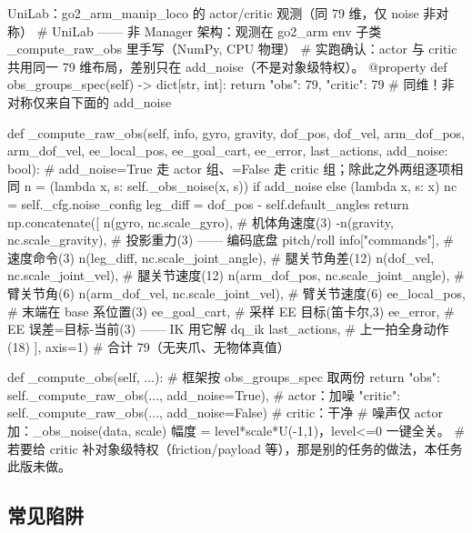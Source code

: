 \begin{codebox}[Python]{UniLab：go2\_arm\_manip\_loco 的 actor/critic 观测（同 79 维，仅 noise 非对称）}
# UniLab —— 非 Manager 架构：观测在 go2_arm env 子类 _compute_raw_obs 里手写（NumPy, CPU 物理）
# 实跑确认：actor 与 critic 共用同一 79 维布局，差别只在 add_noise（不是对象级特权）。
@property
def obs_groups_spec(self) -> dict[str, int]:
    return {"obs": 79, "critic": 79}          # 同维！非对称仅来自下面的 add_noise

def _compute_raw_obs(self, info, gyro, gravity, dof_pos, dof_vel,
                     arm_dof_pos, arm_dof_vel, ee_local_pos, ee_goal_cart,
                     ee_error, last_actions, add_noise: bool):
    # add_noise=True 走 actor 组、=False 走 critic 组；除此之外两组逐项相同
    n = (lambda x, s: self._obs_noise(x, s)) if add_noise else (lambda x, s: x)
    nc = self._cfg.noise_config
    leg_diff = dof_pos - self.default_angles
    return np.concatenate([
        n(gyro, nc.scale_gyro),                        # 机体角速度(3)
        -n(gravity, nc.scale_gravity),                 # 投影重力(3) —— 编码底盘 pitch/roll
        info["commands"],                              # 速度命令(3)
        n(leg_diff, nc.scale_joint_angle),             # 腿关节角差(12)
        n(dof_vel, nc.scale_joint_vel),                # 腿关节速度(12)
        n(arm_dof_pos, nc.scale_joint_angle),          # 臂关节角(6)
        n(arm_dof_vel, nc.scale_joint_vel),            # 臂关节速度(6)
        ee_local_pos,                                  # 末端在 base 系位置(3)
        ee_goal_cart,                                  # 采样 EE 目标(笛卡尔,3)
        ee_error,                                      # EE 误差=目标-当前(3) —— IK 用它解 dq_ik
        last_actions,                                  # 上一拍全身动作(18)
    ], axis=1)                                         # 合计 79（无夹爪、无物体真值）

def _compute_obs(self, ...):                           # 框架按 obs_groups_spec 取两份
    return {"obs":    self._compute_raw_obs(..., add_noise=True),    # actor：加噪
            "critic": self._compute_raw_obs(..., add_noise=False)}  # critic：干净
# 噪声仅 actor 加：_obs_noise(data, scale) 幅度 = level*scale*U(-1,1)，level<=0 一键全关。
# 若要给 critic 补对象级特权（friction/payload 等），那是别的任务的做法，本任务此版未做。
\end{codebox}

\subsection{常见陷阱}
\label{sec:rlmc-lm-obs-pitfalls}

